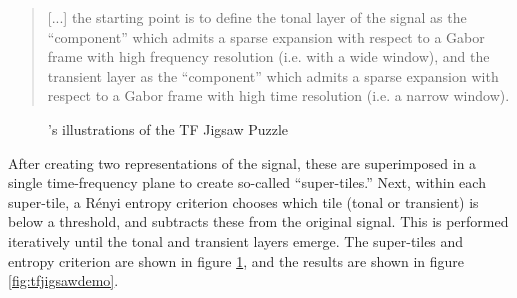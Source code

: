 \documentclass[letter,12pt]{article}
\begin{document}
\begin{quote}
	[...] the starting point is to define the tonal layer of the signal as the ``component'' which admits a sparse expansion with respect to a Gabor frame with high frequency resolution (i.e. with a wide window), and the transient layer as the ``component'' which admits a sparse expansion with respect to a Gabor frame with high time resolution (i.e. a narrow window).
\end{quote}

\begin{figure}[ht]
	\centering
	\hspace{1em}
	\caption{\citet{tfjigsaw}'s illustrations of the TF Jigsaw Puzzle}
	\label{fig:supertiles}
\end{figure}

After creating two representations of the signal, these are superimposed in a single time-frequency plane to create so-called ``super-tiles.'' Next, within each super-tile, a R{\'e}nyi entropy criterion chooses which tile (tonal or transient) is below a threshold, and subtracts these from the original signal. This is performed iteratively until the tonal and transient layers emerge. The super-tiles and entropy criterion are shown in figure \ref{fig:supertiles}, and the results are shown in figure \ref{fig:tfjigsawdemo}.
\end{document}
